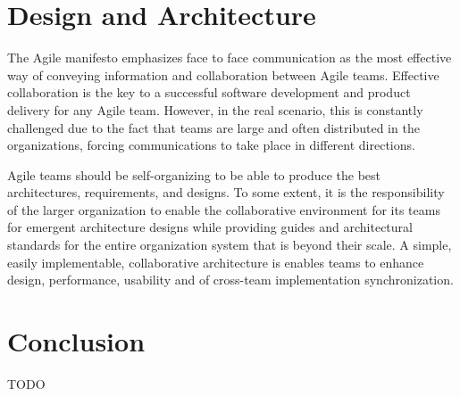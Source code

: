 \documentclass[sigplan,screen]{acmart}
\begin{document}
\section{Design and Architecture}
The Agile manifesto emphasizes face to face communication as the most effective way of conveying information and collaboration between Agile teams. Effective collaboration is the key to a successful software development and product delivery for any Agile team. However, in the real scenario, this is constantly challenged due to the fact that teams are large and often distributed in the organizations, forcing communications to take place in different directions.
\par
Agile teams should be self-organizing to be able to produce the best architectures, requirements, and designs. To some extent, it is the responsibility of the larger organization to enable the collaborative environment for its teams for emergent architecture designs while providing guides and architectural standards for the entire organization system that is beyond their scale. A simple, easily implementable, collaborative architecture is enables teams to enhance design, performance, usability and of cross-team implementation synchronization.

\section{Conclusion}
TODO



\end{document}

